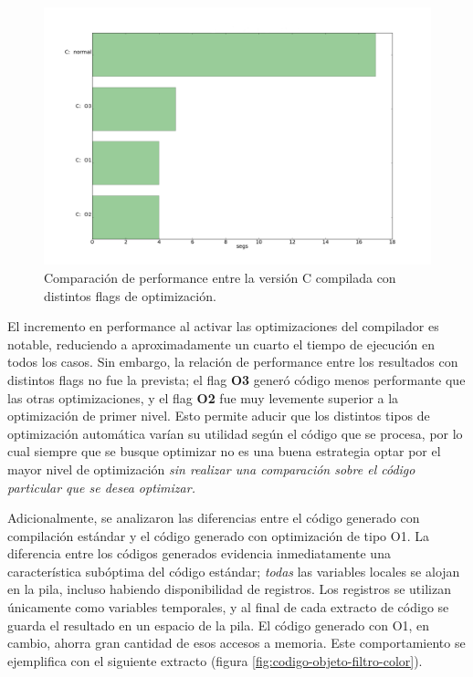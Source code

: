 \begin{figure}[H]
\begin{center}
  \includegraphics[scale=0.35]{secciones/filtro_color/graficos/C_normal_O1_O2_O3.png}
\end{center}
\caption{Comparación de performance entre la versión C compilada con distintos flags de optimización.}
\label{fig:filtro-color-C-vs-Os}
\end{figure}

El incremento en performance al activar las optimizaciones del compilador es notable, reduciendo a aproximadamente un cuarto el tiempo de ejecución en todos los casos. Sin embargo, la relación de performance entre los resultados con distintos flags no fue la prevista; el flag \textbf{O3} generó código menos performante que las otras optimizaciones, y el flag \textbf{O2} fue muy levemente superior a la optimización de primer nivel. Esto permite aducir que los distintos tipos de optimización automática varían su utilidad según el código que se procesa, por lo cual siempre que se busque optimizar no es una buena estrategia optar por el mayor nivel de optimización \emph{sin realizar una comparación sobre el código particular que se desea optimizar.}

Adicionalmente, se analizaron las diferencias entre el código generado con compilación estándar y el código generado con optimización de tipo O1. La diferencia entre los códigos generados evidencia inmediatamente una característica subóptima del código estándar; \emph{todas} las variables locales se alojan en la pila, incluso habiendo disponibilidad de registros. Los registros se utilizan únicamente como variables temporales, y al final de cada extracto de código se guarda el resultado en un espacio de la pila. El código generado con O1, en cambio, ahorra gran cantidad de esos accesos a memoria. Este comportamiento se ejemplifica con el siguiente extracto (figura \ref{fig:codigo-objeto-filtro-color}).



